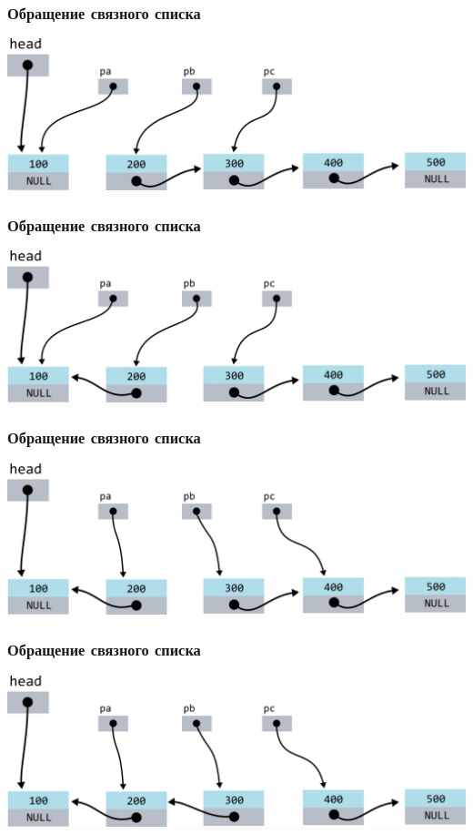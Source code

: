 \documentclass[10pt,pdf,hyperref={unicode}]{beamer}
\begin{document}
\begin{frame}[fragile]
\frametitle{Обращение связного списка}
\begin{center}
\includegraphics[width=\imageSizeMult\linewidth]{../images/reverse_list/reverse_list3.png}
\end{center}
\end{frame}

\begin{frame}[fragile]
\frametitle{Обращение связного списка}
\begin{center}
\includegraphics[width=\imageSizeMult\linewidth]{../images/reverse_list/reverse_list4.png}
\end{center}
\end{frame}

\begin{frame}[fragile]
\frametitle{Обращение связного списка}
\begin{center}
\includegraphics[width=\imageSizeMult\linewidth]{../images/reverse_list/reverse_list5.png}
\end{center}
\end{frame}

\begin{frame}[fragile]
\frametitle{Обращение связного списка}
\begin{center}
\includegraphics[width=\imageSizeMult\linewidth]{../images/reverse_list/reverse_list6.png}
\end{center}
\end{frame}
\end{document}
